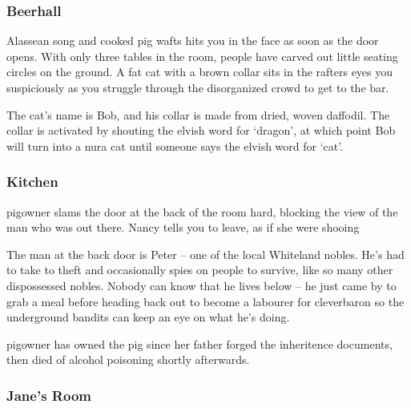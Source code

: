 \subsubsection{Beerhall}

\begin{boxtext}
	Alassean song and cooked pig wafts hits you in the face as soon as the door opens.  With only three tables in the room, people have carved out little seating circles on the ground.  A fat cat with a brown collar sits in the rafters eyes you suspiciously as you struggle through the disorganized crowd to get to the bar.

\end{boxtext}

The cat's name is Bob, and his collar is made from dried, woven daffodil.  The collar is activated by shouting the elvish word for `dragon', at which point Bob will turn into a nura cat until someone says the elvish word for `cat'.


\nuracat



\subsubsection{Kitchen}

\begin{boxtext}
	\Gls{pigowner} slams the door at the back of the room hard, blocking the view of the man who was out there.  Nancy tells you to leave, as if she were shooing 
\end{boxtext}

The man at the back door is Peter -- one of the local Whiteland nobles. He's had to take to theft and occasionally spies on people to survive, like so many other dispossessed nobles.  Nobody can know that he lives below -- he just came by to grab a meal before heading back out to become a labourer for \gls{cleverbaron} so the underground bandits can keep an eye on what he's doing.


\Gls{pigowner} has owned the pig since her father forged the inheritence documents, then died of alcohol poisoning shortly afterwards.

\subsubsection{Jane's Room}


